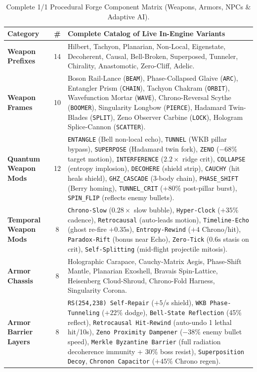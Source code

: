 \documentclass[10pt,letterpaper]{article}
\begin{document}
\begin{table}[ht]
\centering
\caption{Complete 1/1 Procedural Forge Component Matrix (Weapons, Armors, NPCs \& Adaptive AI).}
\label{tab:forge-matrix}
\scriptsize
\begin{tabularx}{\textwidth}{@{} L{2.8cm} c Y @{}}
\toprule
\textbf{Category} & \textbf{\#} & \textbf{Complete Catalog of Live In-Engine Variants} \\
\midrule
\textbf{Weapon Prefixes} & 14 & Hilbert, Tachyon, Planarian, Non-Local, Eigenstate, Decoherent, Causal, Bell-Broken, Superposed, Tunneler, Chirality, Anastomotic, Zero-Cliff, Adelic. \\
\textbf{Weapon Frames} & 10 & Boson Rail-Lance (\texttt{BEAM}), Phase-Collapsed Glaive (\texttt{ARC}), Entangler Prism (\texttt{CHAIN}), Tachyon Chakram (\texttt{ORBIT}), Wavefunction Mortar (\texttt{WAVE}), Chrono-Reversal Scythe (\texttt{BOOMER}), Singularity Longbow (\texttt{PIERCE}), Hadamard Twin-Blades (\texttt{SPLIT}), Zeno Observer Carbine (\texttt{LOCK}), Hologram Splice-Cannon (\texttt{SCATTER}). \\
\textbf{Quantum Weapon Mods} & 12 & \texttt{ENTANGLE} (Bell non-local echo), \texttt{TUNNEL} (WKB pillar bypass), \texttt{SUPERPOSE} (Hadamard twin fork), \texttt{ZENO} ($-68\%$ target motion), \texttt{INTERFERENCE} ($2.2\times$ ridge crit), \texttt{COLLAPSE} (entropy implosion), \texttt{DECOHERE} (shield strip), \texttt{CAUCHY} (hit heals shield), \texttt{GHZ\_CASCADE} (3-body chain), \texttt{PHASE\_SHIFT} (Berry homing), \texttt{TUNNEL\_CRIT} ($+80\%$ post-pillar burst), \texttt{SPIN\_FLIP} (reflects enemy bullets). \\
\textbf{Temporal Weapon Mods} & 8 & \texttt{Chrono-Slow} ($0.28\times$ slow bubble), \texttt{Hyper-Clock} ($+35\%$ cadence), \texttt{Retrocausal} (auto-leads motion), \texttt{Timeline-Echo} (ghost re-fire $+0.35\text{s}$), \texttt{Entropy-Rewind} ($+4$ Chrono/hit), \texttt{Paradox-Rift} (bonus near Echo), \texttt{Zero-Tick} ($0.6\text{s}$ stasis on crit), \texttt{Self-Splitting} (mid-flight projectile mitosis). \\
\textbf{Armor Chassis} & 8 & Holographic Carapace, Cauchy-Matrix Aegis, Phase-Shift Mantle, Planarian Exoshell, Bravais Spin-Lattice, Heisenberg Cloud-Shroud, Chrono-Fold Harness, Singularity Corona. \\
\textbf{Armor Barrier Layers} & 8 & \texttt{RS(254,238) Self-Repair} ($+5$/s shield), \texttt{WKB Phase-Tunneling} ($+22\%$ dodge), \texttt{Bell-State Reflection} (45\% reflect), \texttt{Retrocausal Hit-Rewind} (auto-undo 1 lethal hit/10s), \texttt{Zeno Proximity Dampener} ($-38\%$ enemy bullet speed), \texttt{Merkle Byzantine Barrier} (full radiation decoherence immunity + 30\% boss resist), \texttt{Superposition Decoy}, \texttt{Chronon Capacitor} ($+45\%$ Chrono regen). \\

\end{tabularx}
\end{table}
\end{document}
